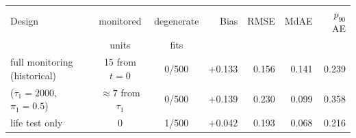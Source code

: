 \begin{tabular}{lccrrrr}
\toprule
Design & monitored & degenerate & Bias & RMSE & MdAE & $p_{90}$AE \\
 & units & fits & & & & \\
full monitoring (historical) & 15 from $t{=}0$ & 0/500 & +0.133 & 0.156 & 0.141 & 0.239 \\
\SLTD{} ($\tau_1{=}2000$, $\pi_1{=}0.5$) & $\approx7$ from $\tau_1$ & 0/500 & +0.139 & 0.230 & 0.099 & 0.358 \\
life test only & 0 & 1/500 & +0.042 & 0.193 & 0.068 & 0.216 \\
\bottomrule
\end{tabular}
